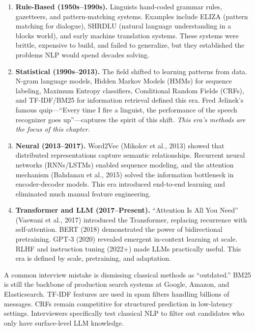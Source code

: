 \begin{enumerate}[label=\textbf{Era \arabic*.}]
    \item \textbf{Rule-Based (1950s--1990s).} Linguists hand-coded grammar rules,
    gazetteers, and pattern-matching systems. Examples include ELIZA (pattern matching for
    dialogue), SHRDLU (natural language understanding in a blocks world), and early
    machine translation systems. These systems were brittle, expensive to build, and
    failed to generalize, but they established the problems NLP would spend decades
    solving.

    \item \textbf{Statistical (1990s--2013).} The field shifted to learning patterns from
    data. N-gram language models, Hidden Markov Models (HMMs) for sequence labeling,
    Maximum Entropy classifiers, Conditional Random Fields (CRFs), and TF-IDF/BM25
    for information retrieval defined this era. Fred Jelinek's famous quip---``Every
    time I fire a linguist, the performance of the speech recognizer goes up''---captures
    the spirit of this shift. \emph{This era's methods are the focus of this chapter.}

    \item \textbf{Neural (2013--2017).} Word2Vec (Mikolov et al., 2013) showed that
    distributed representations capture semantic relationships. Recurrent neural networks
    (RNNs/LSTMs) enabled sequence modeling, and the attention mechanism (Bahdanau et al.,
    2015) solved the information bottleneck in encoder-decoder models. This era introduced
    end-to-end learning and eliminated much manual feature engineering.

    \item \textbf{Transformer and LLM (2017--Present).} ``Attention Is All You Need''
    (Vaswani et al., 2017) introduced the Transformer, replacing recurrence with
    self-attention. BERT (2018) demonstrated the power of bidirectional pretraining. GPT-3
    (2020) revealed emergent in-context learning at scale. RLHF and instruction tuning
    (2022+) made LLMs practically useful. This era is defined by scale, pretraining, and
    adaptation.
\end{enumerate}

\begin{warningbox}
A common interview mistake is dismissing classical methods as ``outdated.'' BM25 is still
the backbone of production search systems at Google, Amazon, and Elasticsearch. TF-IDF
features are used in spam filters handling billions of messages. CRFs remain competitive for
structured prediction in low-latency settings. Interviewers specifically test classical NLP
to filter out candidates who only have surface-level LLM knowledge.
\end{warningbox}

